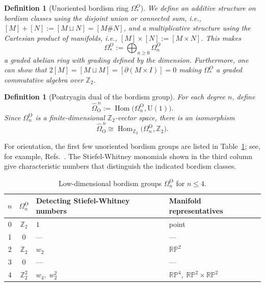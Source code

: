 \documentclass[aps,prx,reprint,superscriptaddress,twocolumn,amsmath,amssymb,amsfonts, nofootinbib]{revtex4-2}
\theoremstyle{apsstyle}
\newtheorem{definition}[theorem]{Definition}
\begin{document}
\begin{definition}[Unoriented bordism ring $\Omega^{O}_{*}$]
We define an additive structure on bordism classes using the disjoint union or connected sum, i.e., $[M]+[N]:=[M\sqcup N]=[M\#N]$, and a multiplicative structure using the Cartesian product of manifolds, i.e., $[M]\times [N]:=[M\times N]$. This makes
\begin{equation}
    \Omega^{O}_{*}:=\bigoplus_{n\geq 0} \Omega_{n}^{O}    
\end{equation}
\noindent a graded abelian ring with grading defined by the dimension. Furthermore, one can show that $2[M]= [M\sqcup M]= [\partial(M\times I)]=0$ making $\Omega_{*}^{O}$ a graded commutative algebra over $\mathbb{Z}_{2}$.
\end{definition}

\bigskip


\begin{definition}[Pontryagin dual of the bordism group]
For each degree $n$, define
\begin{equation}
    \widehat{\Omega}_{\mathrm O}^{\,n}
    :=
    \operatorname{Hom}
    \bigl(\Omega_n^{\mathrm O},\mathrm U(1)\bigr).
\end{equation}
Since $\Omega_n^{\mathrm O}$ is a finite-dimensional $\mathbb Z_2$-vector
space, there is an isomorphism
\begin{equation*}
    \widehat{\Omega}_{\mathrm O}^{\,n}
    \cong
    \operatorname{Hom}_{\mathbb Z_2}
    \bigl(\Omega_n^{\mathrm O},\mathbb Z_2\bigr).
\end{equation*}
\end{definition}

\noindent For orientation, the first few unoriented bordism groups are listed in
Table~\ref{tab:unoriented-cobordism}; see, for example,
Refs.~\cite{Thom1954, Stong_unorCob}. The Stiefel-Whitney monomials
shown in the third column give characteristic numbers that distinguish
the indicated bordism classes.

\begin{table}[H]
\footnotesize
\setlength{\tabcolsep}{4pt}
\centering
\caption{Low-dimensional bordism groups
$\Omega_n^{\mathrm O}$ for $n\leq 4$.}
\label{tab:unoriented-cobordism}
\begin{tabular}{@{}c c l l@{}}
\toprule
$n$ &
$\Omega_n^{\mathrm O}$ &
Detecting Stiefel-Whitney numbers &
Manifold representatives \\[2pt]
\midrule
0 & $\mathbb Z_2$ &
$1$ &
point \\

1 & $0$ &
--- &
--- \\

2 & $\mathbb Z_2$ &
$w_2$ &
$\mathbb{RP}^2$ \\

3 & $0$ &
--- &
--- \\

4 & $\mathbb Z_2^2$ &
$w_4,\;w_2^2$ &
$\mathbb{RP}^4,\;
\mathbb{RP}^2\times\mathbb{RP}^2$ \\
\bottomrule
\end{tabular}
\end{table}
\end{document}
